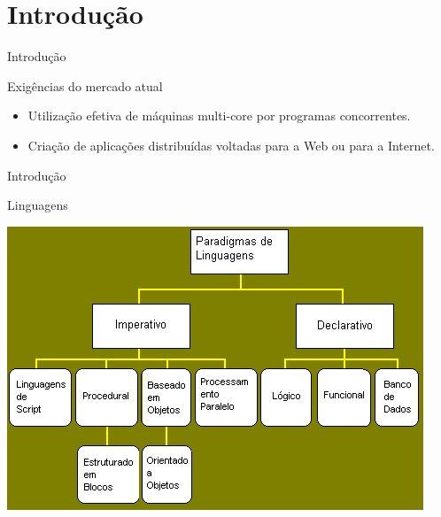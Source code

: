 \section{Introdução}
\begin{frame}{Introdução}
	\begin{block}{Exigências do mercado atual}
		\begin{itemize}
			\item Utilização efetiva de máquinas multi-core por programas concorrentes. 
			\item Criação de aplicações distribuídas voltadas para a Web ou para a Internet.
		\end{itemize}
	\end{block}
\end{frame}

\begin{frame}{Introdução}
    \begin{block}{Linguagens}
        \begin{center}
	        \includegraphics[scale=0.4]{paradigmas-imagem.png} 
        \end{center}
    \end{block}
\end{frame}

